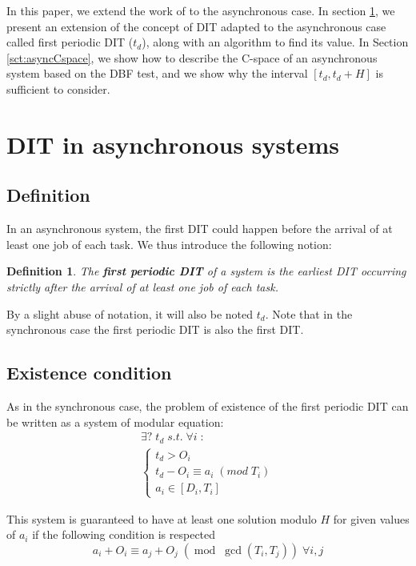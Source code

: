 \documentclass[times, 10pt,twocolumn, a4paper]{article}
\newtheorem{definition}{Definition}
\begin{document}
  In this paper, we extend the work of \cite{george2009characterization} to the asynchronous case. In section \ref{sct:asyncDIT}, we present an extension of the concept of DIT adapted to the asynchronous case called first periodic DIT ($t_d$), along with an algorithm to find its value. In Section \ref{sct:asyncCspace}, we show how to describe the C-space of an asynchronous system based on the DBF test, and we show why the interval $[t_d, t_d + H]$ is sufficient to consider.

\section{DIT in asynchronous systems}
  \label{sct:asyncDIT}

  \subsection{Definition}

  In an asynchronous system, the first DIT could happen before the arrival of at least one job of each task. We thus introduce the following notion:

  \begin{definition}
  The \textbf{first periodic DIT} of a system is the earliest DIT occurring strictly after the arrival of at least one job of each task.
  \end{definition}

  By a slight abuse of notation, it will also be noted $t_d$. Note that in the synchronous case the first periodic DIT is also the first DIT.

  \subsection{Existence condition}

As in the synchronous case, the problem of existence of the first periodic DIT can be written as a system of modular equation:
$$
\begin{array}{l}
  \exists ? \; t_d \; s.t. \; \forall i \; :\\
  \left\{
    \begin{array}{l}
    t_d > O_i \\
    t_d - O_i \equiv a_i \; (mod \; T_i) \\
    a_i \in [D_i, T_i]
  \end{array}
\right.
\end{array}
$$

This system is guaranteed to have at least one solution modulo $H$ for given values of $a_i$ if the following condition is respected $$a_i + O_i \equiv a_j + O_j \; (\operatorname{mod} \; \operatorname{gcd}(T_i, T_j)) \; \forall i, j$$
\end{document}
